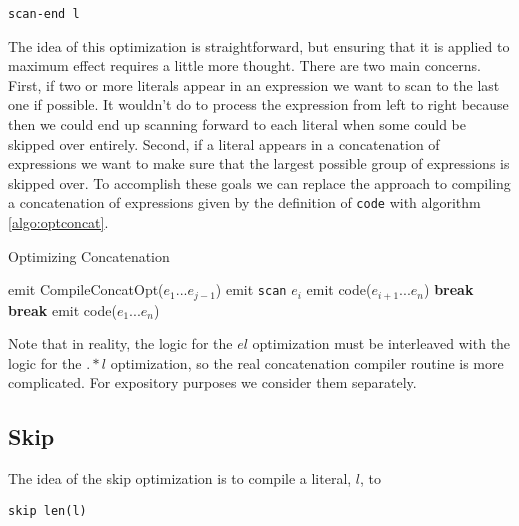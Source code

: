 \begin{verbatim}
scan-end l
\end{verbatim}

The idea of this optimization is straightforward, but ensuring that
it is applied to maximum effect requires a little more thought. There
are two main concerns. First, if two or more literals appear in an
expression we want to scan to the last one if possible. It wouldn't
do to process the expression from left to right because then we could
end up scanning forward to each literal when some could be skipped over
entirely. Second, if a literal appears in a concatenation of expressions
we want to make sure that the largest possible group of expressions
is skipped over. To accomplish these goals we can replace the approach
to compiling a concatenation of expressions given by the definition of
\verb'code' with algorithm \ref{algo:optconcat}.

\begin{algorithm}
\caption{Optimizing Concatenation} \label{algo:optconcat}
\begin{algorithmic}
          \State emit CompileConcatOpt($e_1 ... e_{j-1}$)
          \State emit \verb'scan' $e_i$
          \State emit code($e_{i+1} ... e_n$)
          \State \textbf{break}
        \EndIf
      \EndFor
      \State \textbf{break}
    \EndIf
  \EndFor
    \State emit code($e_1 ... e_n$)
  \EndIf
\EndProcedure
\end{algorithmic}
\end{algorithm}

Note that in reality, the logic for the $el$ optimization must be
interleaved with the logic for the $.*l$ optimization, so the
real concatenation compiler routine is more complicated. For
expository purposes we consider them separately.

\subsection{Skip}
\label{section:skipopt}

The idea of the skip optimization is to compile a literal, $l$, to

\begin{verbatim}
skip len(l)
\end{verbatim}

